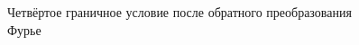 \documentclass[a4paper, 12pt]{article}
\begin{document}
\begin{figure}[h!]
\noindent{}
\caption{Четвёртое граничное условие после обратного преобразования Фурье}
\label{figCurves}
\end{figure}
\end{document}
